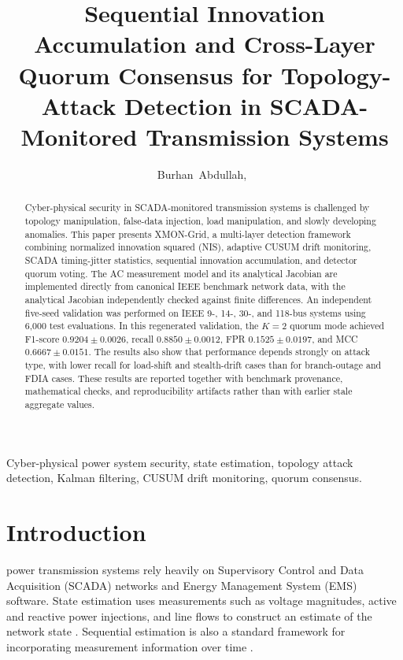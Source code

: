 \documentclass[journal]{IEEEtran}
\begin{document}
\title{Sequential Innovation Accumulation and Cross-Layer Quorum Consensus for Topology-Attack Detection in SCADA-Monitored Transmission Systems}
\author{Burhan~Abdullah,~}
\maketitle

\begin{abstract}
Cyber-physical security in SCADA-monitored transmission systems is challenged by topology manipulation, false-data injection, load manipulation, and slowly developing anomalies. This paper presents XMON-Grid, a multi-layer detection framework combining normalized innovation squared (NIS), adaptive CUSUM drift monitoring, SCADA timing-jitter statistics, sequential innovation accumulation, and detector quorum voting. The AC measurement model and its analytical Jacobian are implemented directly from canonical IEEE benchmark network data, with the analytical Jacobian independently checked against finite differences. An independent five-seed validation was performed on IEEE 9-, 14-, 30-, and 118-bus systems using 6,000 test evaluations. In this regenerated validation, the $K=2$ quorum mode achieved F1-score $0.9204\pm0.0026$, recall $0.8850\pm0.0012$, FPR $0.1525\pm0.0197$, and MCC $0.6667\pm0.0151$. The results also show that performance depends strongly on attack type, with lower recall for load-shift and stealth-drift cases than for branch-outage and FDIA cases. These results are reported together with benchmark provenance, mathematical checks, and reproducibility artifacts rather than with earlier stale aggregate values.
\end{abstract}

\begin{IEEEkeywords}
Cyber-physical power system security, state estimation, topology attack detection, Kalman filtering, CUSUM drift monitoring, quorum consensus.
\end{IEEEkeywords}

\section{Introduction}
 power transmission systems rely heavily on Supervisory Control and Data Acquisition (SCADA) networks and Energy Management System (EMS) software. State estimation uses measurements such as voltage magnitudes, active and reactive power injections, and line flows to construct an estimate of the network state \cite{Abur2004,Monticelli1999}. Sequential estimation is also a standard framework for incorporating measurement information over time \cite{Simon2006}.
\end{document}
